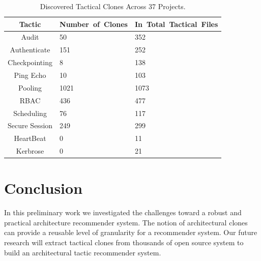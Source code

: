 \begin{table}[tbph]
\vspace{-10pt}
\caption{Discovered Tactical Clones Across 37 Projects.}
\label{tab:ChosenProjects}
\centering

  \begin{tabular}{ c | l | l }
\hline

\bfseries Tactic & \bfseries Number~of~Clones & \bfseries In~Total~Tactical~Files \\ \hline \hline
Audit & 50    & 352 \\ \hline
Authenticate & 151   & 252 \\\hline
Checkpointing & 8     & 138 \\ \hline
Ping Echo & 10    & 103 \\ \hline
Pooling & 1021  & 1073 \\ \hline
RBAC  & 436   & 477 \\ \hline
Scheduling & 76    & 117 \\ \hline
Secure Session & 249   & 299 \\ \hline
HeartBeat & 0     & 11 \\ \hline
Kerbrose & 0     & 21 \\
\end{tabular}%
\vspace{-10pt}
\end{table}


\section{Conclusion}
In this preliminary work we investigated the challenges toward a robust and practical architecture recommender system. The notion of architectural clones can provide a reusable level of granularity for a recommender system. Our future research will extract tactical clones from thousands of open source system to build an architectural tactic recommender system.
